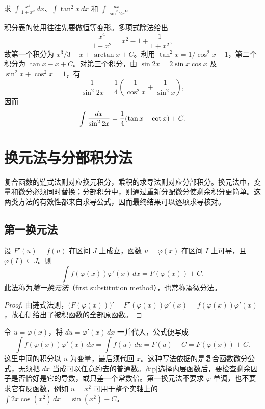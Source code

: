\begin{example}
\label{ex:basic-indefinite-integral-transformations}
求 $\displaystyle\int\frac{x^4}{1+x^2}\,dx$、$\displaystyle\int\tan^2x\,dx$ 和 $\displaystyle\int\frac{dx}{\sin^2 2x}$。
\end{example}

\begin{solve}
积分表的使用往往先要做恒等变形。多项式除法给出
\[
    \frac{x^4}{1+x^2}=x^2-1+\frac1{1+x^2},
\]
故第一个积分为 $x^3/3-x+\arctan x+C$。利用 $\tan^2x=1/\cos^2x-1$，第二个积分为 $\tan x-x+C$。对第三个积分，由 $\sin2x=2\sin x\cos x$ 及 $\sin^2x+\cos^2x=1$，有
\[
    \frac1{\sin^2 2x}=\frac14\left(\frac1{\cos^2x}+\frac1{\sin^2x}\right),
\]
因而
\[
    \int\frac{dx}{\sin^2 2x}=\frac14(\tan x-\cot x)+C.
    \qedhere
\]
\end{solve}

\section{换元法与分部积分法}
\label{sec:substitution-and-integration-by-parts}

复合函数的链式法则对应换元积分，乘积的求导法则对应分部积分。换元法中，变量和微分必须同时替换；分部积分中，则通过重新分配微分使剩余积分更简单。这两类方法的有效性都来自求导公式，因而最终结果可以逐项求导核对。

\subsection{第一换元法}
\label{subsec:first-substitution-method}

\begin{theorem}[第一换元积分法]
\label{thm:first-substitution-indefinite-integral}
设 $F'(u)=f(u)$ 在区间 $J$ 上成立，函数 $u=\varphi(x)$ 在区间 $I$ 上可导，且 $\varphi(I)\subseteq J$。则
\begin{equation}
    \int f(\varphi(x))\varphi'(x)\,dx
       =F(\varphi(x))+C.
    \label{eq:first-substitution-indefinite-integral}
\end{equation}
此法称为\emph{第一换元法}（first substitution method），也常称凑微分法。
\end{theorem}

\begin{proof}
由链式法则，$\bigl(F(\varphi(x))\bigr)'=F'(\varphi(x))\varphi'(x)=f(\varphi(x))\varphi'(x)$，故右侧给出了被积函数的全部原函数。
\end{proof}

令 $u=\varphi(x)$，将 $du=\varphi'(x)\,dx$ 一并代入，公式便写成
\[
    \int f(\varphi(x))\varphi'(x)\,dx
       =\int f(u)\,du=F(u)+C=F(\varphi(x))+C.
\]
这里中间的积分以 $u$ 为变量，最后须代回 $x$。这种写法依据的是复合函数微分公式，无须把 $dx$ 当成可以任意约去的普通数。\emph[tip]{选择内层函数后，要检查剩余因子是否恰好是它的导数，或只差一个常数倍。}第一换元法不要求 $\varphi$ 单调，也不要求它有反函数，例如 $u=x^2$ 可用于整个实轴上的 $\int 2x\cos(x^2)\,dx=\sin(x^2)+C$。

